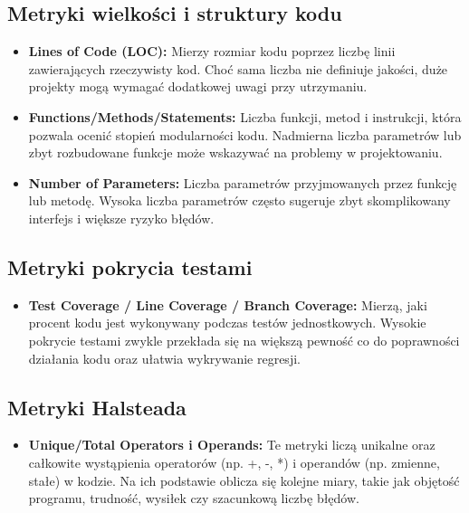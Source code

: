 \documentclass[a4paper,12pt]{article}
\begin{document}
\subsection{Metryki wielkości i struktury kodu}
\begin{itemize} \item \textbf{Lines of Code (LOC):} Mierzy rozmiar kodu poprzez liczbę linii zawierających rzeczywisty kod. Choć sama liczba nie definiuje jakości, duże projekty mogą wymagać dodatkowej uwagi przy utrzymaniu. \item \textbf{Functions/Methods/Statements:} Liczba funkcji, metod i instrukcji, która pozwala ocenić stopień modularności kodu. Nadmierna liczba parametrów lub zbyt rozbudowane funkcje może wskazywać na problemy w projektowaniu. \item \textbf{Number of Parameters:} Liczba parametrów przyjmowanych przez funkcję lub metodę. Wysoka liczba parametrów często sugeruje zbyt skomplikowany interfejs i większe ryzyko błędów. \end{itemize}
\subsection{Metryki pokrycia testami}
\begin{itemize} \item \textbf{Test Coverage / Line Coverage / Branch Coverage:} Mierzą, jaki procent kodu jest wykonywany podczas testów jednostkowych. Wysokie pokrycie testami zwykle przekłada się na większą pewność co do poprawności działania kodu oraz ułatwia wykrywanie regresji. \end{itemize}
\subsection{Metryki Halsteada}
\begin{itemize} \item \textbf{Unique/Total Operators i Operands:} Te metryki liczą unikalne oraz całkowite wystąpienia operatorów (np. +, -, *) i operandów (np. zmienne, stałe) w kodzie. Na ich podstawie oblicza się kolejne miary, takie jak objętość programu, trudność, wysiłek czy szacunkową liczbę błędów. \end{itemize}
\end{document}
